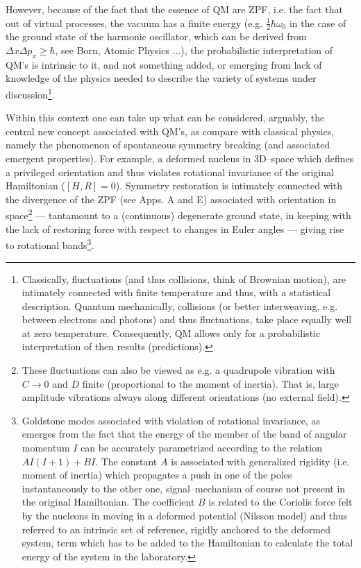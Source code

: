 \documentclass[a4paper,onecolumn,superscriptaddress,12pt,nofootinbib,twoside,raggedfooter,notitlepage]{revtex4-1}
\begin{document}
\pagebreak

However, because of the fact that the essence of QM are ZPF, i.e. the fact that out of virtual processes, the vacuum has a finite energy (e.g. $\frac{1}{2} \hbar \omega_0$ in the case of the ground state of the harmonic oscillator, which can be derived from $\Delta x \Delta p_x \geq \hbar$, see Born, Atomic Physics $\ldots$), the probabilistic interpretation of QM's is intrinsic to it, and not something added, or emerging from lack of knowledge of the physics needed to describe the variety of systems under discussion\footnote{Classically, fluctuations (and thus collisions, think of Brownian motion), are intimately connected with finite temperature and thus, with a statistical description. Quantum mechanically, collisions (or better interweaving, e.g. between electrons and photons) and thus fluctuations, take place equally well at zero temperature. Consequently, QM allows only for a probabilistic interpretation of then results (predictions).}.

Within this context one can take up what can be considered, arguably, the central new concept associated with QM's, as compare with classical physics, namely the phenomenon of spontaneous symmetry breaking (and associated emergent properties). For example, a deformed nucleus in 3D--space which defines a privileged orientation and thus violates rotational invariance of the original Hamiltonian ($[H,R]=0$). Symmetry restoration is intimately connected with the divergence of the ZPF (see Apps. A and E) associated with orientation in space\footnote{These fluctuations can also be viewed as e.g. a quadrupole vibration with $C \rightarrow 0$ and $D$ finite (proportional to the moment of inertia). That is, large amplitude vibrations always along different orientations (no external field).} --- tantamount to a (continuous) degenerate ground state, in keeping with the lack of restoring force with respect to changes in Euler angles --- giving rise to rotational bands\footnote{Goldstone modes associated with violation of rotational invariance, as emerges from the fact that the energy of the member of the band of angular momentum $I$ can be accurately parametrized according to the relation $AI(I+1)+BI$. The constant $A$ is associated with generalized rigidity (i.e. moment of inertia) which propagates a push in one of the poles instantaneously to the other one, signal--mechanism of course not present in the original Hamiltonian. The coefficient $B$ is related to the Coriolis force felt by the nucleons in moving in a deformed potential (Nilsson model) and thus referred to an intrinsic set of reference, rigidly anchored to the deformed system, term which has to be added to the Hamiltonian to calculate the total energy of the system in the laboratory.}.
\end{document}
